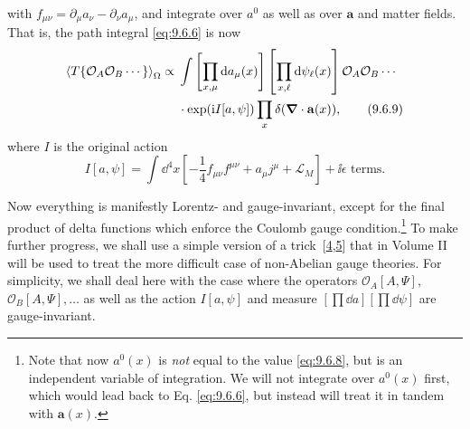 with $f_{\mu\nu}=\partial_\mu a_\nu-\partial_\nu a_\mu$, and integrate over
$a^0$ as well as over $\mathbf a$ and matter fields. That is, the path
integral \eqref{eq:9.6.6} is now
\begin{align}
\left\langle T\{\mathcal O_A\mathcal O_B\cdots\}\right\rangle_{\Omega}
\propto{}&\int\left[\prod_{x,\mu}\mathop{}\!\mathrm{d} a_\mu(x)\right]
 \left[\prod_{x,\ell}\mathop{}\!\mathrm{d}\psi_\ell(x)\right]
 \mathcal O_A\mathcal O_B\cdots
\notag\\
&\cdot\exp(\mathrm{i} I[a,\psi])
 \prod_x\delta(\boldsymbol\nabla\cdot\mathbf a(x)),
\tag{9.6.9}\label{eq:9.6.9}
\end{align}
where $I$ is the original action
\begin{equation}
I[a,\psi]=\int \dd^4x\left[-\frac14f_{\mu\nu}f^{\mu\nu}
 +a_\mu j^\mu+\mathcal L_M\right]+\ii\epsilon\text{ terms}.
\tag{9.6.10}\label{eq:9.6.10}
\end{equation}

Now everything is manifestly Lorentz- and gauge-invariant, except for the
final product of delta functions which enforce the Coulomb gauge
condition.\footnote{Note that now $a^0(x)$ is \emph{not} equal to the value
\eqref{eq:9.6.8}, but is an independent variable of integration. We will not integrate
over $a^0(x)$ first, which would lead back to Eq. \eqref{eq:9.6.6}, but instead will
treat it in tandem with $\mathbf a(x)$.} To make further progress, we shall use
a simple version of a trick~[\hyperref[ref:9.4]{4},\hyperref[ref:9.5]{5}] that in Volume II will be used to treat the
more difficult case of non-Abelian gauge theories. For simplicity, we shall
deal here with the case where the operators $\mathcal O_A[A,\Psi]$,
$\mathcal O_B[A,\Psi],\ldots$ as well as the action $I[a,\psi]$ and measure
$[\prod \dd a][\prod \dd\psi]$ are gauge-invariant.

